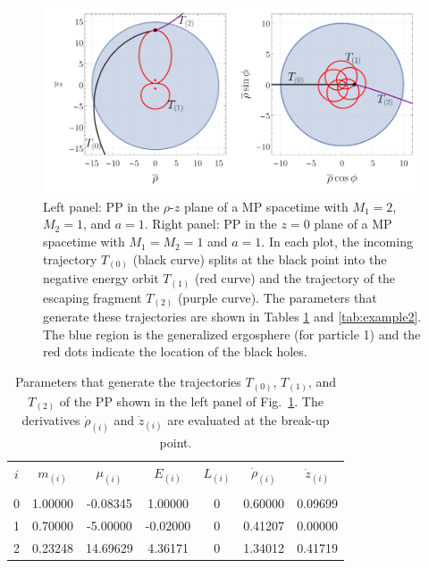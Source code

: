 \begin{figure}[!ht]
  \centering
  \includegraphics[width=\linewidth]{img/penrose_binaries/fig6.pdf}
  \caption{Left panel: \ac{PP} in the $\rho$-$z$ plane of a \ac{MP} spacetime with $M_1=2$, $M_2=1$, and $a=1$. Right panel: \ac{PP} in the $z=0$ plane of a \ac{MP} spacetime with $M_1=M_2=1$ and $a=1$. In each plot, the incoming trajectory $T_{(0)}$ (black curve) splits at the black point into the negative energy orbit $T_{(1)}$ (red curve) and the trajectory of the escaping fragment $T_{(2)}$ (purple curve). The parameters that generate these trajectories are shown in Tables \ref{tab:example1} and \ref{tab:example2}. The blue region is the generalized ergosphere (for particle 1) and the red dots indicate the location of the black holes.}
  \label{fig:example1}
\end{figure}

\begin{table}[h]
  \centering
  \begin{tabular}{ccccccc}
    \hline\hline
    $i$ & $m_{(i)}$ & $\mu_{(i)}$ & $E_{(i)}$ & $L_{(i)}$ & $\dot{\rho}_{(i)}$ & $\dot{z}_{(i)}$ \\ \vspace{-0.3cm} \\
    0   & 1.00000   & -0.08345    & 1.00000   & 0         & 0.60000            & 0.09699         \\
    1   & 0.70000   & -5.00000    & -0.02000  & 0         & 0.41207            & 0.00000         \\
    2   & 0.23248   & 14.69629    & 4.36171   & 0         & 1.34012            & 0.41719         \\
    \hline\hline
  \end{tabular}
  \caption{Parameters that generate the trajectories $T_{(0)}$, $T_{(1)}$, and $T_{(2)}$ of the \ac{PP} shown in the left panel of Fig.~\ref{fig:example1}. The derivatives $\dot{\rho}_{(i)}$ and $\dot{z}_{(i)}$ are evaluated at the break-up point.}
  \label{tab:example1}
\end{table}

